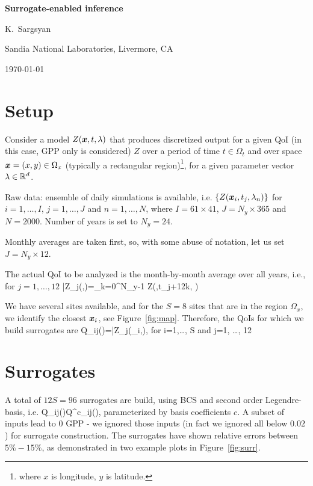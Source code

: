 \documentclass[12pt]{article}
\begin{document}
\centerline{\Large\bf Surrogate-enabled inference}
\medskip
\centerline{K.~Sargsyan}
\centerline{Sandia National Laboratories, Livermore, CA}
\centerline{\today}
\medskip


\section{Setup} \label{sec:setup}

Consider a model $Z({\mbox{\boldmath $x$}}, t, \lambda)$ that produces discretized output for a given QoI (in this case, GPP only is considered) $Z$
over a period of time $t\in \Omega_t$ and over space ${\mbox{\boldmath $x$}}=(x,y)\in \Omega_x$
(typically a rectangular region)\footnote{where $x$ is longitude, $y$ is
latitude.}, for a given parameter vector $\lambda\in \mathbb{R}^d$.

\bi
\item Raw data: ensemble of daily simulations is available, i.e. $\{Z({\mbox{\boldmath $x$}}_i, t_j, \lambda_n)\}$
for $i=1,\dots, I$, $j=1,\dots, J$ and $n=1, \dots, N$, where $I=61\times 41$,
$J=N_y\times 365$ and $N=2000$. Number of years is set to $N_y=24$.
\item Monthly averages are taken first, so, with some abuse of notation,
let us set $J=N_y \times 12$.
\item The actual QoI to be analyzed is the month-by-month average over all years, i.e., for $j=1,\dots, 12$
\be
\bar{Z_j}(\vx,\lambda)=\sum_{k=0}^{N_y-1} Z(\vx,t_{j+12k}, \lambda)
\ee
\item We have several sites available, and for the $S=8$ sites that are in the region $\Omega_x$, we identify the closest ${\mbox{\boldmath $x$}}_i$, see Figure~\ref{fig:map}. Therefore, the QoIs for which we build surrogates are
\be
Q_{ij}(\lambda)=\bar{Z_j}(\vx_i,\lambda), \textrm{  for } i=1,\dots, S \textrm{ and  } j=1, \dots, 12
\ee
\ei

\section{Surrogates}

A total of $12S=96$ surrogates are build, using BCS and second order Legendre-basis, i.e. 
\be
Q_{ij}(\lambda)\approx Q^c_{ij}(\lambda),
\ee
parameterized by basis coefficients $c$. A subset of inputs lead to $0$ GPP - we ignored those inputs (in fact we ignored all below $0.02$) for surrogate construction. The surrogates have shown relative errors between $5\%-15\%$, as demonstrated in two example plots in Figure~\ref{fig:surr}.
\end{document}
